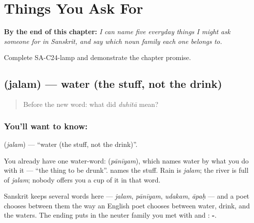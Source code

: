 
\chapter{Things You Ask For}
\label{ch:sa-ask-for}

\begin{chapteropening}
\textbf{By the end of this chapter:} \emph{I can name five everyday things I might ask someone for in Sanskrit, and say which noun family each one belongs to.}

Complete SA-C24-lamp and demonstrate the chapter promise.
\end{chapteropening}

\section[\texorpdfstring{\sk{जलम्} (jalam)}{जलम् (jalam)}]{ (jalam) — water (the stuff, not the drink)}

\label{lesson:SA-C24-water}



\begin{quote}
Before the new word: what did \emph{duhitā} mean?
\end{quote}

\subsection*{You'll want to know: }
\textbf{} (\emph{jalam}) — \textquotedblleft{}water (the stuff, not the drink)\textquotedblright{}.

You already have one water-word: \textbf{} (\emph{pānīyam}), which names water by what you do with it — \textquotedblleft{}the thing to be drunk\textquotedblright{}. \textbf{} names the stuff. Rain is \emph{jalam}; the river is full of \emph{jalam}; nobody offers you a cup of it in that word.

Sanskrit keeps several words here — \emph{jalam}, \emph{pānīyam}, \emph{udakam}, \emph{āpaḥ} — and a poet chooses between them the way an English poet chooses between water, drink, and the waters. The ending puts  in the neuter family you met with  and : \textbf{-}.


